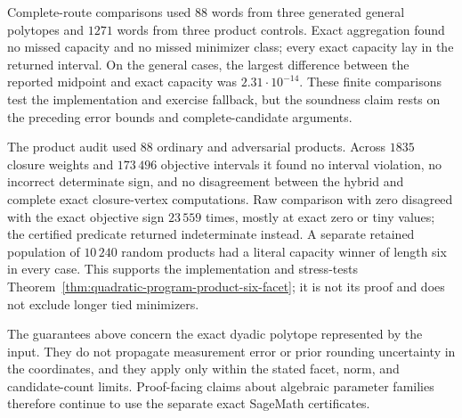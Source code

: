 Complete-route comparisons used \(88\) words from three generated general
polytopes and \(1271\) words from three product controls.  Exact aggregation
found no missed capacity and no missed minimizer class; every exact capacity
lay in the returned interval.  On the general cases, the largest difference
between the reported midpoint and exact capacity was \(2.31\cdot10^{-14}\).
These finite comparisons test the implementation and exercise fallback, but
the soundness claim rests on the preceding error bounds and complete-candidate
arguments.

The product audit used \(88\) ordinary and adversarial products.  Across
\(1835\) closure weights and \(173\,496\) objective intervals it found no
interval violation, no incorrect determinate sign, and no disagreement between
the hybrid and complete exact closure-vertex computations.  Raw comparison
with zero disagreed with the exact objective sign \(23\,559\) times, mostly at
exact zero or tiny values; the certified predicate returned indeterminate
instead.  A separate retained population of \(10\,240\) random products had a
literal capacity winner of length six in every case.  This supports the
implementation and stress-tests
Theorem~\ref{thm:quadratic-program-product-six-facet}; it is not its proof and
does not exclude longer tied minimizers.

The guarantees above concern the exact dyadic polytope represented by the
input.  They do not propagate measurement error or prior rounding uncertainty
in the coordinates, and they apply only within the stated facet, norm, and
candidate-count limits.  Proof-facing claims about algebraic parameter
families therefore continue to use the separate exact SageMath certificates.
